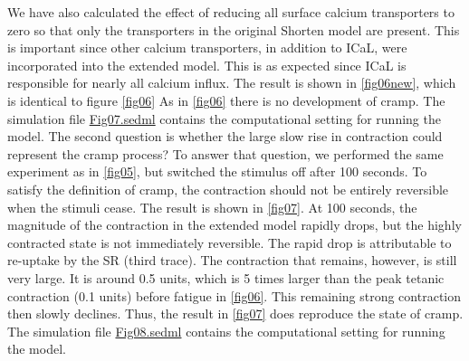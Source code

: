 \documentclass[fleqn,10pt]{physiome}
\begin{document}
We have also calculated the effect of reducing all surface calcium transporters to zero so that only the transporters in the original Shorten model are present. This is important since other calcium transporters, in addition to ICaL, were incorporated into the extended model. This is as expected since ICaL is responsible for nearly all calcium influx. The result is shown in \autoref{fig06new}, which is identical to figure \ref{fig06} As in \autoref{fig06} there is no development of cramp. The simulation file \href{http://models.cellml.org/workspace/5f4/file/4071d5b4ec40c5e2b845a7a75e942df1966d2ba2/Fig07.sedml}{Fig07.sedml} contains the computational setting for running the model. The second question is whether the large slow rise in contraction could represent the cramp process? To answer that question, we performed the same experiment as in \autoref{fig05}, but switched the stimulus off after 100 seconds. To satisfy the definition of cramp, the contraction should not be entirely reversible when the stimuli cease. The result is shown in \autoref{fig07}. At 100 seconds, the magnitude of the contraction in the extended model rapidly drops, but the highly contracted state is not immediately reversible. The rapid drop is attributable to re-uptake by the SR (third trace). The contraction that remains, however, is still very large. It is around 0.5 units, which is 5 times larger than the peak tetanic contraction (0.1 units) before fatigue in \autoref{fig06}. This remaining strong contraction then slowly declines. Thus, the result in \autoref{fig07} does reproduce the state of cramp. The simulation file \href{http://models.cellml.org/workspace/5f4/file/4071d5b4ec40c5e2b845a7a75e942df1966d2ba2/Fig08.sedml}{Fig08.sedml} contains the computational setting for running the model.
\end{document}
